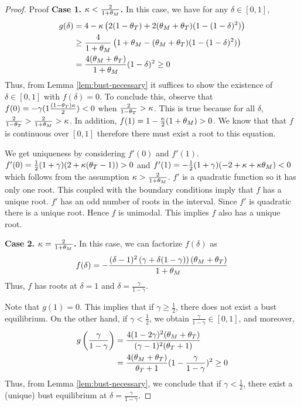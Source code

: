 \begin{proof}{Proof}
\textbf{Case 1. $\kappa < \frac{2}{1+\tm}$.}  In this case, we have for any $\delta \in [0,1]$, 
\begin{align*}
    g(\delta) &= 4 - \kappa \left(2(1-\tt) + 2 ( \tm +\tt) (1- (1-\delta)^2) \right) \\ 
    &\geq \frac{4}{1+\tm} \left(1 + \tm - (\tm + \tt) ( 1- (1-\delta)^2) \right) \\
    &= \frac{4 (\tm +\tt)}{1+\tm} (1-\delta)^2 \geq 0 
\end{align*}
Thus, from Lemma \ref{lem:bust-necessary} it suffices to show the existence of $\delta \in [0,1]$ with $f(\delta) = 0$. To conclude this, observe that $f(0) = -\gamma ( 1 \frac{(1-\tt) \kappa}{2}) < 0$ when $\frac{2}{1-\tt} > \kappa$. This is true because for all $\delta$, $\frac{2}{1-\tt} > \frac{2}{1+\tm} > \kappa$.  In addition, $f(1) =  1 - \frac{\kappa}{2}(1 + \tm) > 0$. We know that that $f$ is continuous over $[0,1]$ therefore there must exist a root to this equation.

We  get uniqueness by considering $f'(0)$ and $f'(1)$. $f'(0) = \frac{1}{2} (1+\gamma) ( 2 + \kappa (\tt - 1))>0$ and $f'(1) = -\frac{1}{2} (1+\gamma) (-2 + \kappa + \kappa \tm ) < 0$ which follows from the assumption $\kappa > \frac{2}{1+\tm}$.  $f'$ is a quadratic function so it has only one root. This coupled with the boundary conditions imply that $f$ has a unique root. $f'$ has an odd number of roots in the interval. Since $f'$ is quadratic there is a unique root. Hence $f$ is unimodal. This implies $f$ also has a unique root.



\textbf{Case 2. $\kappa = \frac{2}{1+\tm}$.} In this case, we can factorize $f(\delta)$ as
\begin{align*}
    f(\delta) = -\frac{ (\delta -1)^2  \left(\gamma + \delta (1-\gamma ) \right) (\tm + \tt)}{1 +\tm}
\end{align*}
Thus, $f$ has roots at $\delta =1$ and $\delta = \frac{\gamma}{1 - \gamma}$.  

Note that $g(1) =  0$. This implies that if $\gamma \geq \frac{1}{2}$, there does not exist a bust equilibrium. On the other hand, if $\gamma < \frac{1}{2}$, we obtain $\frac{\gamma}{1 - \gamma} \in [0,1]$, and moreover, 
\begin{align*}
g\left(\frac{\gamma}{1 - \gamma}\right) & = \frac{4 (1-2 \gamma)^2 (\tm+\tt)}{(\gamma-1)^2 (\tt+1)} \\
&=  \frac{4(\tm + \tt)}{\tt+1} (1-\frac{\gamma}{1-\gamma})^2 \geq 0    
\end{align*}
Thus, from Lemma \ref{lem:bust-necessary}, we conclude that if $\gamma < \frac{1}{2}$, there exist a (unique) bust equilibrium at $\delta = \frac{\gamma}{1 - \gamma}$.


\end{proof}
